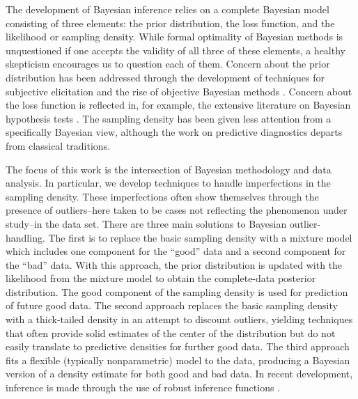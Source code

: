 \documentclass[12pt]{article}
\begin{document}
The development of Bayesian inference relies on a complete Bayesian model consisting of 
three elements:  the prior distribution, the loss function, and the likelihood or sampling density.  While formal
optimality of Bayesian methods is unquestioned if one accepts the validity of all three of these elements, 
 a healthy skepticism encourages us to question each of them.  Concern about the prior distribution has
been addressed through the development of techniques for subjective elicitation \citep{garthwaite2005} and
the rise of objective Bayesian methods \citep{berger2006}.  
Concern about the loss function is reflected in, for example, the
extensive literature on Bayesian hypothesis tests \citep{kass1995}.  
The sampling density has been given less attention from a specifically
Bayesian view, although the work on predictive diagnostics \citep{box1980} departs from classical
traditions.  

The focus of this work is the intersection of Bayesian methodology and data analysis.  In particular, 
we develop techniques to handle imperfections in the sampling density.  These imperfections often show
themselves through the presence of outliers--here taken to be cases not reflecting the phenomenon under
study--in the data set.  
There are three main solutions to Bayesian outlier-handling.  The first is to replace the basic sampling
density with a mixture model which includes one component for the ``good'' data and a second 
component for the ``bad'' data.  With this approach, the prior distribution is updated with the likelihood
from the mixture model to obtain the complete-data posterior distribution.  The good component of
the sampling density is used for prediction of future good data.  The second approach replaces the
basic sampling density with a thick-tailed density in an attempt to discount outliers, yielding techniques that 
often provide solid estimates of the center of the distribution but 
do not easily translate to predictive
densities for further good data.  The third approach fits a flexible (typically nonparametric) model to 
the data, producing a Bayesian version of a density estimate for both good and bad data.  In recent 
development, inference 
is made through the use of robust inference functions \citep[][in press]{lee2013}.  
\end{document}
